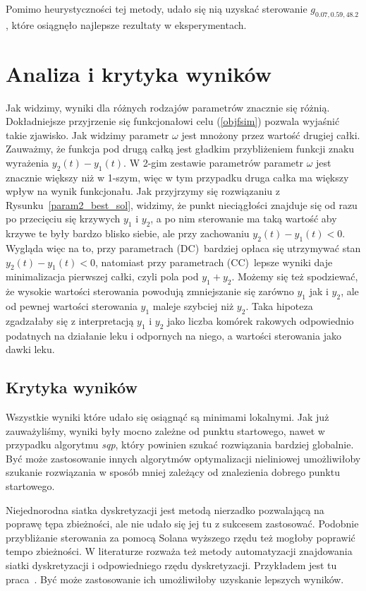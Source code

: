\documentclass[11pt]{article}
\begin{document}
Pomimo heurystyczności tej metody, udało się nią uzyskać sterowanie $g_{0.07,0.59,48.2}$, które osiągnęło najlepsze rezultaty w eksperymentach.

\section{Analiza i krytyka wyników}

Jak widzimy, wyniki dla różnych rodzajów parametrów znacznie się różnią. Dokładniejsze przyjrzenie się funkcjonałowi celu (\ref{objfsim}) pozwala wyjaśnić takie zjawisko. Jak widzimy parametr $\omega$ jest mnożony przez wartość drugiej całki. Zauważmy, że funkcja pod drugą całką jest gładkim przybliżeniem funkcji znaku wyrażenia $y_2(t) - y_1(t)$. W 2-gim zestawie parametrów parametr $\omega$ jest znacznie większy niż w 1-szym, więc w tym przypadku druga całka ma większy wpływ na wynik funkcjonału. Jak przyjrzymy się rozwiązaniu z Rysunku~\ref{param2_best_sol}, widzimy, że punkt nieciągłości znajduje się od razu po przecięciu się krzywych $y_1$ i $y_2$, a po nim sterowanie ma taką wartość aby krzywe te były bardzo blisko siebie, ale przy zachowaniu $y_2(t) - y_1(t) < 0$. Wygląda więc na to, przy parametrach (DC)\ bardziej opłaca się utrzymywać stan $y_2(t) - y_1(t) < 0$, natomiast przy parametrach (CC)\ lepsze wyniki daje minimalizacja pierwszej całki, czyli pola pod $y_1 + y_2$. Możemy się też spodziewać, że wysokie wartości sterowania powodują zmniejszanie się zarówno $y_1$ jak i $y_2$, ale od pewnej wartości sterowania $y_1$ maleje szybciej niż $y_2$. Taka hipoteza zgadzałaby się z interpretacją $y_1$ i $y_2$ jako liczba komórek rakowych odpowiednio podatnych na działanie leku i odpornych na niego, a wartości sterowania jako dawki leku.

\subsection{Krytyka wyników}
Wszystkie wyniki które udało się osiągnąć są minimami lokalnymi. Jak już zauważyliśmy, wyniki były mocno zależne od punktu startowego, nawet w przypadku algorytmu {\it sqp}, który powinien szukać rozwiązania bardziej globalnie. Być może zastosowanie innych algorytmów optymalizacji nieliniowej umożliwiłoby szukanie rozwiązania w sposób mniej zależący od znalezienia dobrego punktu startowego.

Niejednorodna siatka dyskretyzacji jest metodą nierzadko pozwalającą na poprawę tępa zbieżności, ale nie udało się jej tu z sukcesem zastosować. Podobnie przybliżanie sterowania za pomocą Solana wyższego rzędu też mogłoby poprawić tempo zbieżności. W literaturze rozważa też metody automatyzacji znajdowania siatki dyskretyzacji i odpowiedniego rzędu dyskretyzacji. Przykładem jest tu praca~\cite{Rao-ph}. Być może zastosowanie ich umożliwiłoby uzyskanie lepszych wyników.
\end{document}
